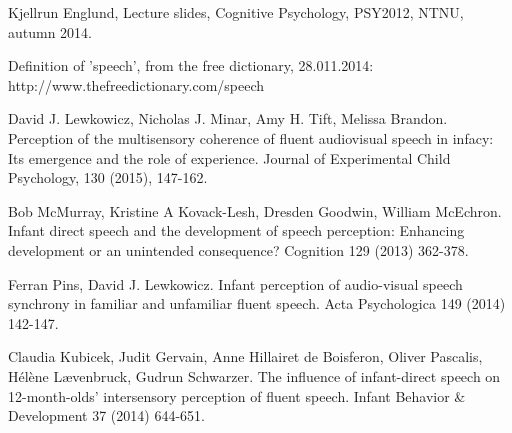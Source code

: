 \documentclass[12pt, a4paper]{article}
\begin{document}
\begin{thebibliography}{1}

Kjellrun Englund, Lecture slides, Cognitive Psychology, PSY2012, NTNU, autumn
2014. 

Definition of 'speech', from the free dictionary, 28.011.2014: http://www.thefreedictionary.com/speech

David J. Lewkowicz, Nicholas J. Minar, Amy H. Tift, Melissa Brandon. Perception
of the multisensory coherence of fluent audiovisual speech in infacy: Its
emergence and the role of experience. Journal of Experimental Child Psychology,
130 (2015), 147-162. 

Bob McMurray, Kristine A Kovack-Lesh, Dresden Goodwin, William McEchron. Infant
direct speech and the development of speech perception: Enhancing development
or an unintended consequence? Cognition 129 (2013) 362-378.

Ferran Pins, David J. Lewkowicz. Infant perception of audio-visual speech
synchrony in familiar and unfamiliar fluent speech. Acta Psychologica 149
(2014) 142-147. 

Claudia Kubicek, Judit Gervain, Anne Hillairet de Boisferon, Oliver Pascalis,
Hélène Lævenbruck, Gudrun Schwarzer. 
The influence of infant-direct speech on 12-month-olds' intersensory perception
of fluent speech. 
Infant Behavior \& Development 37 (2014) 644-651.

\end{thebibliography}
\end{document}
